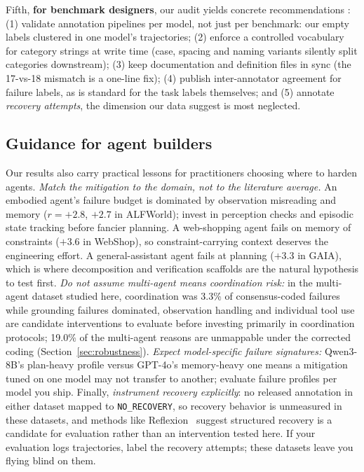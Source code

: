 \documentclass[12pt,letterpaper]{article}
\begin{document}
Fifth, \textbf{for benchmark designers}, our audit yields concrete
recommendations
\label{sec:recommendations}: (1) validate annotation pipelines per model, not just per
benchmark: our empty labels clustered in one model's trajectories;
(2) enforce a controlled vocabulary for category strings at write time
(case, spacing and naming variants silently split categories downstream);
(3) keep documentation and definition files in sync (the 17-vs-18 mismatch
is a one-line fix); (4) publish inter-annotator agreement for failure
labels, as is standard for the task labels themselves; and (5) annotate
\emph{recovery attempts}, the dimension our data suggest is most neglected.

\subsection{Guidance for agent builders}
\label{sec:builders}
Our results also carry practical lessons for practitioners choosing where to
harden agents. \emph{Match the mitigation to the domain, not to the
literature average.} An embodied agent's failure budget is dominated by
observation misreading and memory ($r{=}+2.8$, $+2.7$ in ALFWorld); invest
in perception checks and episodic state tracking before fancier planning.
A web-shopping agent fails on memory of constraints ($+3.6$ in WebShop), so
constraint-carrying context deserves the engineering effort. A
general-assistant agent fails at planning ($+3.3$ in GAIA), which is where
decomposition and verification scaffolds are the natural hypothesis to test
first. \emph{Do not assume
multi-agent means coordination risk:} in the multi-agent dataset studied
here, coordination was 3.3\% of consensus-coded failures while grounding
failures dominated, observation handling and individual tool use are candidate
interventions to evaluate before investing primarily in coordination protocols;
19.0\% of the multi-agent reasons are unmappable under the corrected coding (Section~\ref{sec:robustness}). \emph{Expect model-specific
failure signatures:} Qwen3-8B's plan-heavy profile versus GPT-4o's
memory-heavy one means a mitigation tuned on one model may not transfer to
another; evaluate failure profiles per model you ship. Finally,
\emph{instrument recovery explicitly}: no released annotation in either
dataset mapped to \texttt{NO\_RECOVERY}, so recovery behavior is unmeasured
in these datasets, and methods like Reflexion~\cite{shinn2023reflexion}
suggest structured recovery is a candidate for evaluation rather than an intervention tested here. If your evaluation logs trajectories, label the recovery
attempts; these datasets leave you flying blind on them.
\end{document}
